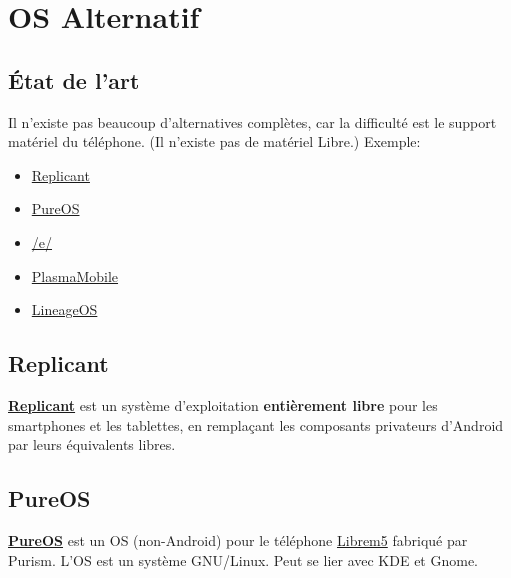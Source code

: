 \documentclass[aspectratio=169]{beamer}
\begin{document}

\section{OS Alternatif}

\begin{frame}
\begin{center}
\huge{\color{cvp}{OS Alternatif}}
\end{center}
\end{frame}

\subsection{État de l'art}
\begin{frame}
Il n'existe pas beaucoup d'alternatives complètes, car la difficulté est le support matériel du téléphone. (Il n'existe pas de matériel Libre.)\newline
\newline
Exemple:
\begin{itemize}
	\item \href{https://www.replicant.us}{Replicant}
	\item \href{https://www.pureos.net}{PureOS}
	\item \href{https://e.foundation}{/e/}
	\item \href{https://www.plasma-mobile.org}{PlasmaMobile}
	\item \href{https://lineageos.org}{LineageOS}
\end{itemize}
\end{frame}

\subsection{Replicant}
\begin{frame}
\href{https://fr.wikipedia.org/wiki/Replicant_\%28syst\%C3\%A8me_d\%27exploitation\%29}{\textbf{Replicant}} est un système d'exploitation \textbf{entièrement libre} pour les smartphones et les tablettes, en remplaçant les composants privateurs d'Android par leurs équivalents libres.
\end{frame}

\subsection{PureOS}
\begin{frame}
\href{https://puri.sm/products/librem-5/pureos-mobile/}{\textbf{PureOS}} est un OS (non-Android) pour le téléphone \href{https://puri.sm/products/librem-5/}{Librem5} fabriqué par Purism.\newline
\newline
L'OS est un système GNU/Linux.\newline
Peut se lier avec KDE et Gnome.
\end{frame}
\end{document}
